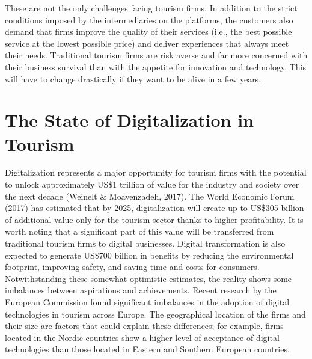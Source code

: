 \documentclass[
  letterpaper,
  DIV=11,
  numbers=noendperiod]{scrreprt}
\begin{document}
These are not the only challenges facing tourism firms. In addition to
the strict conditions imposed by the intermediaries on the platforms,
the customers also demand that firms improve the quality of their
services (i.e., the best possible service at the lowest possible price)
and deliver experiences that always meet their needs. Traditional
tourism firms are risk averse and far more concerned with their business
survival than with the appetite for innovation and technology. This will
have to change drastically if they want to be alive in a few years.

\hypertarget{the-state-of-digitalization-in-tourism}{%
\section{The State of Digitalization in
Tourism}\label{the-state-of-digitalization-in-tourism}}

Digitalization represents a major opportunity for tourism firms with the
potential to unlock approximately US\$1 trillion of value for the
industry and society over the next decade (Weinelt \& Moavenzadeh,
2017). The World Economic Forum (2017) has estimated that by 2025,
digitalization will create up to US\$305 billion of additional value
only for the tourism sector thanks to higher profitability. It is worth
noting that a significant part of this value will be transferred from
traditional tourism firms to digital businesses. Digital transformation
is also expected to generate US\$700 billion in benefits by reducing the
environmental footprint, improving safety, and saving time and costs for
consumers. Notwithstanding these somewhat optimistic estimates, the
reality shows some imbalances between aspirations and achievements.
Recent research by the European Commission found significant imbalances
in the adoption of digital technologies in tourism across Europe. The
geographical location of the firms and their size are factors that could
explain these differences; for example, firms located in the Nordic
countries show a higher level of acceptance of digital technologies than
those located in Eastern and Southern European countries.
\end{document}
